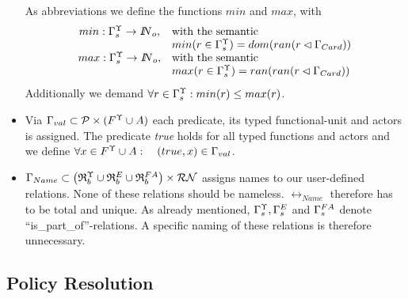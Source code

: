 \begin{itemize}
		As abbreviations we define the functions $min$ and $max$, with
		$$
		\begin{array}{cl}
		min: {\Gamma}^{\Upsilon}_{s} \rightarrow { I\!\!N}_{o}, & \mbox{with the semantic} \\
		& min(r \in {\Gamma}^{\Upsilon}_{s}) = dom( ran( r \lhd \Gamma_{Card})) \\
		max: {\Gamma}^{\Upsilon}_{s} \rightarrow { I\!\!N}_{o}, & \mbox{with the semantic} \\
		& max(r \in {\Gamma}^{\Upsilon}_{s}) = ran( ran ( r \lhd \Gamma_{Card}))
		\end{array}
		$$
		Additionally we demand $\forall r \in {\Gamma}^{\Upsilon}_{s}: min(r) \leq max(r)$.

	\item Via $\Gamma_{val} \subset \mathcal{P} \times (F^{\Upsilon} \cup A)$ each predicate, its typed functional-unit and actors is assigned. The predicate {\em true} holds for all typed functions and actors and we define $\forall x \in F^{\Upsilon} \cup A: \quad (true, x) \in \Gamma_{val}$.

	\item $\rel_{Name} \subset \bigl( \typbenutzerrelationenmenge \cup \relmengebenutzerinstOE_F \cup \relmengebenutzerFA \bigr) \times \relname$
		assigns names to our user-defined relations. None of these relations should be nameless. $\rel_{Name}$ therefore has to be total and unique.
		As already mentioned, $\typstrukturrelation, \relstrukturOE_F$ and	${\Gamma}^{FA}_{s}$ denote ``is\_part\_of''-relations. A specific naming of these 		relations is therefore unnecessary.
\end{itemize}

\subsection{Policy Resolution}\label{PolicyResolutionFormal}

